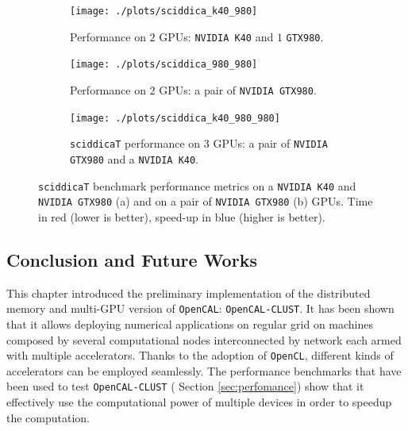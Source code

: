 \begin{figure}
	\vspace{-0.5cm}
	\begin{subfigure}{1.0\textwidth}
	
		\texttt{[image: ./plots/sciddica\_k40\_980]}
			\caption{Performance on $2$ GPUs: \texttt{NVIDIA K40} and $1$ \texttt{GTX980}.}
		\label{fig:sciddica_k40_980}
	\end{subfigure}        
	\endminipage \hfill

	\begin{subfigure}{1.0\textwidth}
		\texttt{[image: ./plots/sciddica\_980\_980]}
		\caption{Performance on $2$ GPUs: a pair of \texttt{NVIDIA GTX980}.}
		\label{fig:sciddica_980_980}
	\end{subfigure}
	\endminipage\hfill
	\begin{subfigure}{1.0\textwidth}
		\texttt{[image: ./plots/sciddica\_k40\_980\_980]}
		\caption[\texttt{sciddicaT} performance on $3$ GPUs.]{\texttt{sciddicaT} performance on $3$ GPUs: a pair of \texttt{NVIDIA GTX980} and a \texttt{NVIDIA K40}.}
		\label{fig:sciddica_k40_980_980}
	\end{subfigure}
	\endminipage\hfill
	
	\caption[\texttt{sciddicaT} benchmark performance metrics.]{\texttt{sciddicaT} benchmark performance metrics on a \texttt{NVIDIA K40} and \texttt{NVIDIA GTX980} (a) and on  a pair of \texttt{NVIDIA GTX980} (b) GPUs. Time in red (lower is better), speed-up in blue (higher is better).}
	\label{fig:sciddica_performance}
\end{figure}

\subsection{Conclusion and Future Works}
This chapter introduced the preliminary implementation of the distributed memory and multi-GPU  version of \texttt{OpenCAL}: \texttt{OpenCAL-CLUST}.
It has been shown that it allows deploying numerical applications on regular grid on machines composed by several computational nodes interconnected by network each armed with multiple accelerators. Thanks to the adoption of \texttt{OpenCL}, different kinds of accelerators can be employed seamlessly.
The performance benchmarks that have been used to test \texttt{OpenCAL-CLUST} ( Section \ref{sec:perfomance}) show that it effectively use the computational power of multiple devices in order to speedup the computation.

